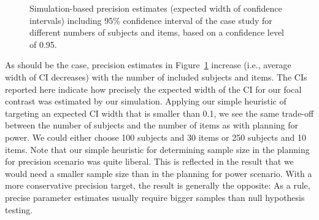 \documentclass[
  man,
  floatsintext,
  longtable,
  a4paper,
  nolmodern,
  notxfonts,
  notimes,
  colorlinks=true,linkcolor=blue,citecolor=blue,urlcolor=blue]{apa7}
\begin{document}
\begin{figure}[H]

\caption{\label{fig-finalprecision}Simulation-based precision estimates
(expected width of confidence intervals) including 95\% confidence
interval of the case study for different numbers of subjects and items,
based on a confidence level of 0.95.}


\end{figure}%

As should be the case, precision estimates in
Figure~\ref{fig-finalprecision} increase (i.e., average width of CI
decreases) with the number of included subjects and items. The CIs
reported here indicate how precisely the expected width of the CI for
our focal contrast was estimated by our simulation. Applying our simple
heuristic of targeting an expected CI width that is smaller than 0.1, we
see the same trade-off between the number of subjects and the number of
items as with planning for power. We could either choose 100 subjects
and 30 items or 250 subjects and 10 items. Note that our simple
heuristic for determining sample size in the planning for precision
scenario was quite liberal. This is reflected in the result that we
would need a smaller sample size than in the planning for power
scenario. With a more conservative precision target, the result is
generally the opposite: As a rule, precise parameter estimates usually
require bigger samples than null hypothesis testing.
\end{document}
